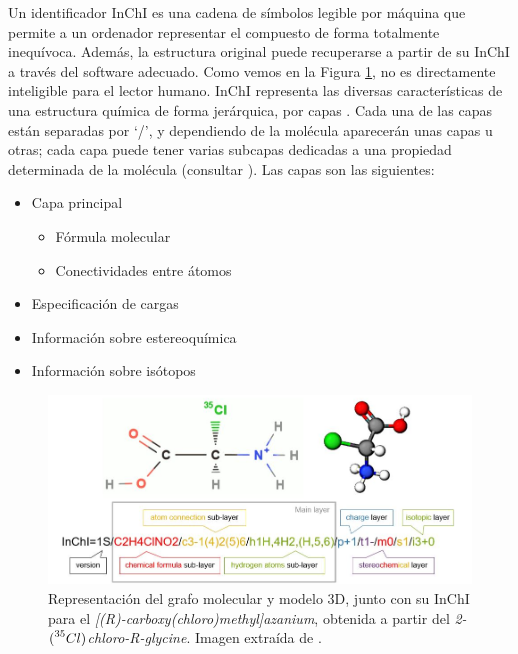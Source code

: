 Un identificador InChI es una cadena de símbolos legible por máquina que permite a un ordenador representar el compuesto de forma totalmente inequívoca. Además, la estructura original puede recuperarse a partir de su InChI a través del software adecuado. Como vemos en la Figura \ref{fig:inchi_ejemplo}, no es directamente inteligible para el lector humano. InChI representa las diversas características de una estructura química de forma jerárquica, por capas \cite{heller_inchi_2015, heller_inchi_resumed_2013}. Cada una de las capas están separadas por `/', y dependiendo de la molécula aparecerán unas capas u otras; cada capa puede tener varias subcapas dedicadas a una propiedad determinada de la molécula (consultar \cite{heller_inchi_2015, heller_inchi_resumed_2013}). Las capas son las siguientes: 
\begin{itemize}
    \item Capa principal
    \begin{itemize}
        \item Fórmula molecular
        \item Conectividades entre átomos
    \end{itemize}
    \item Especificación de cargas
    \item Información sobre estereoquímica
    \item Información sobre isótopos
\end{itemize}

\begin{figure}[h!]
    \centering
    \includegraphics[scale=0.48]{imagenes/estado_arte/teoria/inchi_ejemplo.png}
    \caption{Representación del grafo molecular y modelo 3D, junto con su InChI para el \textit{[(R)-carboxy(chloro)methyl]azanium}, obtenida a partir del \textit{2-$(\prescript{35}{}{Cl})$chloro-R-glycine}. Imagen extraída de \cite{libretext_linenotation}.}
    \label{fig:inchi_ejemplo}
\end{figure}


